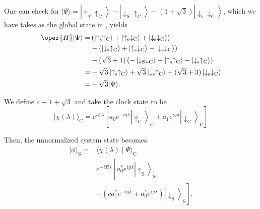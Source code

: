 One can check for $|\Psi\rangle=\left|\uparrow_S \uparrow_{\mathrm{C}}\right\rangle
-\left|\downarrow_{\mathrm{S}} \uparrow_{\mathrm{C}}\right\rangle-(1+\sqrt{3})\left|
\downarrow_{\mathrm{s}} \downarrow_{\mathrm{C}}\right\rangle$, 
which we have takes as the global state in , yields
\begin{equation}
\begin{aligned}
\oper{H}|\Psi\rangle= & \left(\left|\uparrow_{\mathrm{s}} \uparrow_{\mathrm{C}}\right\rangle+\left|\uparrow_{\mathrm{s}} \downarrow_{\mathrm{C}}\right\rangle+\left|\downarrow_{\mathrm{s}} \downarrow_{\mathrm{C}}\right\rangle\right) \\
& -\left(\left|\downarrow_{\mathrm{s}} \uparrow_{\mathrm{C}}\right\rangle+\left|\uparrow_{\mathrm{s}} \downarrow_{\mathrm{C}}\right\rangle-\left|\downarrow_{\mathrm{s}} \downarrow_{\mathrm{C}}\right\rangle\right) \\
& -(\sqrt{3}+1)\left(-\left|\downarrow_{\mathrm{S}} \downarrow_{\mathrm{C}}\right\rangle+\left|\uparrow_{\mathrm{s}} \uparrow_{\mathrm{C}}\right\rangle-\left|\downarrow_{\mathrm{s}} \uparrow_{\mathrm{C}}\right\rangle\right) \\
= & -\sqrt{3}\left|\uparrow_{\mathrm{s}} \uparrow_{\mathrm{C}}\right\rangle+\sqrt{3}\left|\downarrow_{\mathrm{s}} \uparrow_{\mathrm{C}}\right\rangle+(\sqrt{3}+3)\left|\downarrow_{\mathrm{s}} \downarrow_{\mathrm{C}}\right\rangle \\
= & -\sqrt{3}|\Psi\rangle .
\end{aligned}
\end{equation}

We define $c \equiv 1+\sqrt{3}$ and take the clock state to be
\begin{equation}
|\chi(\lambda)\rangle_{\mathrm{C}}=e^{i E \lambda}\left[a_0 e^{-i g \lambda}\left|\uparrow_{\mathrm{C}}\right\rangle_{\mathrm{C}}+a_1 e^{i g \lambda}\left|\downarrow_{\mathrm{C}}\right\rangle_{\mathrm{C}}\right]
\end{equation}

Then, the unnormalized system state becomes
\begin{equation}
\begin{aligned}
|\phi\rangle_{\mathrm{S}}= & \langle\chi(\lambda) \mid \Psi\rangle_{\mathrm{C}} \\
= & e^{-i E \lambda}\left[a_0^* e^{i g \lambda}\left|\uparrow_{\mathrm{S}}\right\rangle_{\mathrm{S}}\right. \\
& \left.-\left(c a_1^* e^{-i g \lambda}+a_0^* e^{i g \lambda}\right)\left|\downarrow_{\mathrm{S}}\right\rangle_{\mathrm{S}}\right] .
\end{aligned}
\end{equation}

